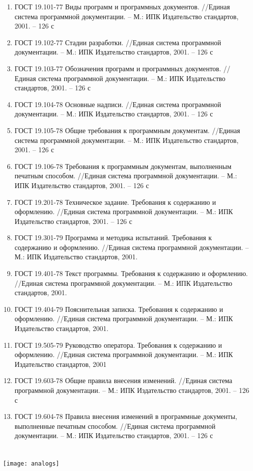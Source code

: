 \documentclass{../TechDoc}
\begin{document}
    \begin{enumerate}
        \item ГОСТ 19.101-77 Виды программ и программных документов. //Единая система программной документации. – М.: ИПК Издательство стандартов, 2001. – 126 с
        \item ГОСТ 19.102-77 Стадии разработки. //Единая система программной документации. – М.: ИПК Издательство стандартов, 2001. – 126 с
        \item ГОСТ 19.103-77 Обозначения программ и программных документов. //Единая система программной документации. – М.: ИПК Издательство стандартов, 2001. – 126 с
        \item ГОСТ 19.104-78 Основные надписи. //Единая система программной документации. – М.: ИПК Издательство стандартов, 2001. – 126 с
        \item ГОСТ 19.105-78 Общие требования к программным документам. //Единая система программной документации. – М.: ИПК Издательство стандартов, 2001. – 126 с
        \item ГОСТ 19.106-78 Требования к программным документам, выполненным печатным способом. //Единая система программной документации. – М.: ИПК Издательство стандартов, 2001. – 126 с
        \item ГОСТ 19.201-78 Техническое задание. Требования к содержанию и оформлению. //Единая система программной документации. – М.: ИПК Издательство стандартов, 2001. – 126 с
        \item ГОСТ 19.301-79 Программа и методика испытаний. Требования к содержанию и оформлению. //Единая система программной документации. – М.: ИПК Издательство стандартов, 2001.
        \item ГОСТ 19.401-78 Текст программы. Требования к содержанию и оформлению. //Единая система программной документации. – М.: ИПК Издательство стандартов, 2001.
        \item ГОСТ 19.404-79 Пояснительная записка. Требования к содержанию и оформлению. //Единая система программной документации. – М.: ИПК Издательство стандартов, 2001.
        \item ГОСТ 19.505-79 Руководство оператора. Требования к содержанию и оформлению. //Единая система программной документации. – М.: ИПК Издательство стандартов, 2001
        \item ГОСТ 19.603-78 Общие правила внесения изменений. //Единая система программной документации. – М.: ИПК Издательство стандартов, 2001. – 126 с
        \item ГОСТ 19.604-78 Правила внесения изменений в программные документы, выполненные печатным способом. //Единая система программной документации. – М.: ИПК Издательство стандартов, 2001. – 126 с
    \end{enumerate}

    \clearpage

    \registrationList

    \raggedright\section*{}
    \texttt{[image: analogs]}
        
\end{document}
